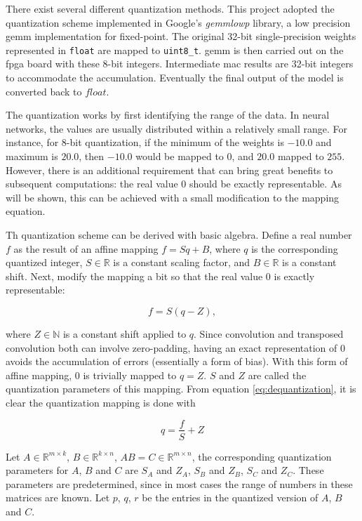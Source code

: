 There exist several different quantization methods. This project adopted the quantization scheme
implemented in Google's \textit{gemmlowp} library, a low precision \gls{gemm} implementation for fixed-point.
The original 32-bit single-precision weights represented in \texttt{float} are mapped to 
\texttt{uint8\_t}. \gls{gemm} is then
carried out on the \gls{fpga} board with these 8-bit integers. Intermediate \gls{mac} results are 32-bit
integers to accommodate the accumulation. Eventually the final output of the model is converted back to
$float$.

The quantization works by first identifying the range of the data. In neural networks, the values are usually
distributed within a relatively small range. For instance, for 8-bit quantization, if the minimum of the
weights is $-10.0$ and maximum is $20.0$, then $-10.0$ would be mapped to $0$, and $20.0$ mapped to $255$.
However, there is an additional requirement that can bring great benefits to subsequent computations:
the real value $0$ should be exactly representable. As will be shown, this can be achieved with a small
modification to the mapping equation.

Th quantization scheme can be derived with basic algebra. Define a real number $f$ as the result of an affine
mapping $f = S q + B$, where $q$ is the corresponding quantized integer, $S \in \mathbb{R}$ is a constant
scaling factor, and $B \in \mathbb{R}$ is a constant shift. Next, modify the mapping a bit so that the
real value $0$ is exactly representable:

\begin{equation} \label{eq:dequantization}
  f = S(q - Z),
\end{equation}

where $Z \in \mathbb{N}$ is a constant shift applied to $q$. Since convolution and transposed convolution
both can involve zero-padding, having an exact representation of $0$ avoids the accumulation of errors
(essentially a form of bias). With this form of affine mapping, $0$ is trivially mapped to $q = Z$. $S$ and
$Z$ are called the quantization parameters of this mapping. From equation \ref{eq:dequantization},
it is clear the quantization mapping is done with

\begin{equation} \label{eq:quantization}
  q = \frac{f}{S} + Z
\end{equation}

Let $A \in \mathbb{R}^{m \times k}$, $B \in \mathbb{R}^{k \times n}$, $A B = C \in \mathbb{R}^{m \times n}$,
the corresponding quantization parameters for $A$, $B$ and $C$ are $S_A$ and $Z_A$, $S_B$ and $Z_B$,
$S_C$ and $Z_C$. These parameters are predetermined, since in most cases the range of numbers in these matrices
are known. Let $p$, $q$, $r$ be the entries in the quantized version of $A$, $B$ and $C$. 

